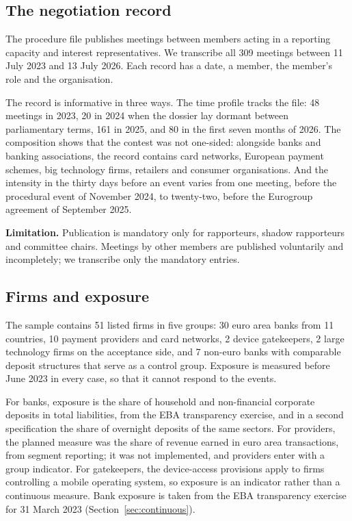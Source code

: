\documentclass[11pt]{article}
\theoremstyle{plain}\newtheorem{proposition}{Proposition}
\begin{document}
\begin{table}[t]
\begin{threeparttable}
\end{threeparttable}
\end{table}

\subsection{The negotiation record}

The procedure file publishes meetings between members acting in a reporting capacity and interest representatives. We transcribe all 309 meetings between 11 July 2023 and 13 July 2026. Each record has a date, a member, the member's role and the organisation.

The record is informative in three ways. The time profile tracks the file: 48 meetings in 2023, 20 in 2024 when the dossier lay dormant between parliamentary terms, 161 in 2025, and 80 in the first seven months of 2026. The composition shows that the contest was not one-sided: alongside banks and banking associations, the record contains card networks, European payment schemes, big technology firms, retailers and consumer organisations. And the intensity in the thirty days before an event varies from one meeting, before the procedural event of November 2024, to twenty-two, before the Eurogroup agreement of September 2025.

\textbf{Limitation.} Publication is mandatory only for rapporteurs, shadow rapporteurs and committee chairs. Meetings by other members are published voluntarily and incompletely; we transcribe only the mandatory entries.

\subsection{Firms and exposure}

The sample contains 51 listed firms in five groups: 30 euro area banks from 11 countries, 10 payment providers and card networks, 2 device gatekeepers, 2 large technology firms on the acceptance side, and 7 non-euro banks with comparable deposit structures that serve as a control group. Exposure is measured before June 2023 in every case, so that it cannot respond to the events.

For banks, exposure is the share of household and non-financial corporate deposits in total liabilities, from the EBA transparency exercise, and in a second specification the share of overnight deposits of the same sectors. For providers, the planned measure was the share of revenue earned in euro area transactions, from segment reporting; it was not implemented, and providers enter with a group indicator. For gatekeepers, the device-access provisions apply to firms controlling a mobile operating system, so exposure is an indicator rather than a continuous measure. Bank exposure is taken from the EBA transparency exercise for 31 March 2023 (Section~\ref{sec:continuous}).
\end{document}

